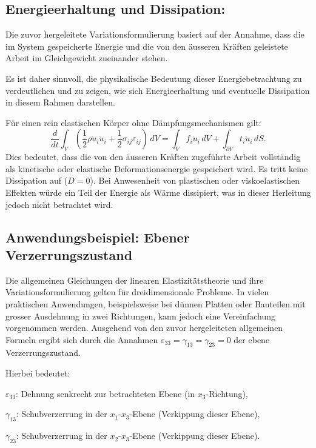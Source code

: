 \subsection{Energieerhaltung und Dissipation:}
Die zuvor hergeleitete Variationsformulierung basiert auf der Annahme, dass die im System gespeicherte Energie und die von den äusseren Kräften geleistete Arbeit im Gleichgewicht zueinander stehen. 

Es ist daher sinnvoll, die physikalische Bedeutung dieser Energiebetrachtung zu verdeutlichen und zu zeigen, wie sich Energieerhaltung und eventuelle Dissipation in diesem Rahmen darstellen.


Für einen rein elastischen Körper ohne Dämpfungsmechanismen gilt:
\begin{equation}
	\frac{d}{dt} \int_V \left( \frac{1}{2} \rho \dot{u}_i \dot{u}_i + \frac{1}{2} \sigma_{ij} \varepsilon_{ij} \right) \, dV = 
	\int_V f_i \dot{u}_i \, dV + \int_{\partial V} t_i \dot{u}_i \, dS.
\end{equation}
Dies bedeutet, dass die von den äusseren Kräften zugeführte Arbeit vollständig als kinetische oder elastische Deformationsenergie gespeichert wird. 
Es tritt keine Dissipation auf ($D=0$). 
Bei Anwesenheit von plastischen oder viskoelastischen Effekten würde ein Teil der Energie als Wärme dissipiert, was in dieser Herleitung jedoch nicht betrachtet wird.

\subsection{Anwendungsbeispiel: Ebener Verzerrungszustand}
Die allgemeinen Gleichungen der linearen Elastizitätstheorie und ihre Variationsformulierung gelten für dreidimensionale Probleme. 
In vielen praktischen Anwendungen, beispielsweise bei dünnen Platten oder Bauteilen mit grosser Ausdehnung in zwei Richtungen, kann jedoch eine Vereinfachung vorgenommen werden. 
Ausgehend von den zuvor hergeleiteten allgemeinen Formeln ergibt sich durch die Annahmen  \(\varepsilon_{33} = \gamma_{13} = \gamma_{23} = 0\) der ebene Verzerrungszustand. 

Hierbei bedeutet:

$\varepsilon_{33}$: Dehnung senkrecht zur betrachteten Ebene (in $x_3$-Richtung),

$\gamma_{13}$: Schubverzerrung in der $x_1$-$x_3$-Ebene (Verkippung dieser Ebene),

$\gamma_{23}$: Schubverzerrung in der $x_2$-$x_3$-Ebene (Verkippung dieser Ebene).

